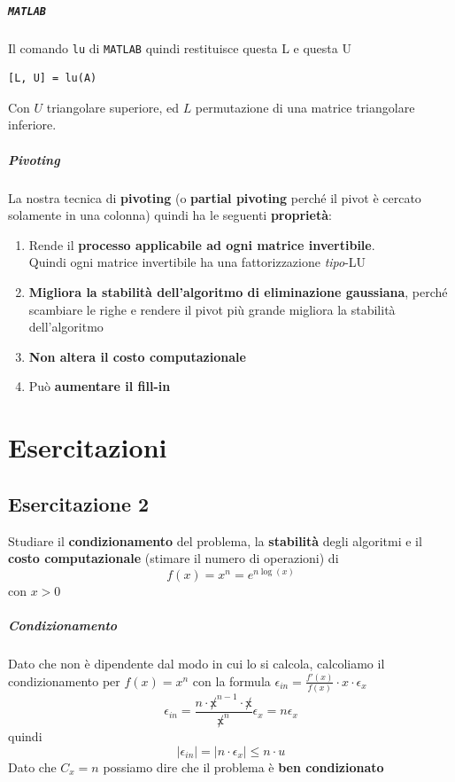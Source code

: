 \documentclass[10pt]{book}
\begin{document}
\paragraph{\texttt{MATLAB}} Il comando \texttt{lu} di \texttt{MATLAB} quindi restituisce questa L e questa U
\begin{lstlisting}
[L, U] = lu(A)
\end{lstlisting}
Con $U$ triangolare superiore, ed $L$ permutazione di una matrice triangolare inferiore.
\paragraph{Pivoting} La nostra tecnica di \textbf{pivoting} (o \textbf{partial pivoting} perché il pivot è cercato solamente in una colonna) quindi ha le seguenti \textbf{proprietà}:
\begin{enumerate}
	\item Rende il \textbf{processo applicabile ad ogni matrice invertibile}.\\
	Quindi ogni matrice invertibile ha una fattorizzazione \textit{tipo}-LU
	\item \textbf{Migliora la stabilità dell'algoritmo di eliminazione gaussiana}, perché scambiare le righe e rendere il pivot più grande migliora la stabilità dell'algoritmo
	\item \textbf{Non altera il costo computazionale}
	\item Può \textbf{aumentare il fill-in}
\end{enumerate}

\chapter{Esercitazioni}
\section{Esercitazione 2}
Studiare il \textbf{condizionamento} del problema, la \textbf{stabilità} degli algoritmi e il \textbf{costo computazionale} (stimare il numero di operazioni) di $$f(x) = x^n = e^{n\log(x)}$$ con $x > 0$
\paragraph{Condizionamento} Dato che non è dipendente dal modo in cui lo si calcola, calcoliamo il condizionamento per $f(x) = x^n$ con la formula $\epsilon_{in} = \frac{f'(x)}{f(x)}\cdot x\cdot\epsilon_x$ $$\epsilon_{in} = \frac{n\cdot \not x^{n-1} \cdot \not x}{\not x^n}\epsilon_x = n\epsilon_x$$ quindi $$|\epsilon_{in}| = |n\cdot \epsilon_x| \leq n\cdot u$$
Dato che $C_x = n$ possiamo dire che il problema è \textbf{ben condizionato}
\end{document}
